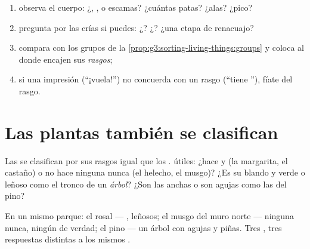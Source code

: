 \begin{method}\label{met:g3:sorting-living-things:sort}
\begin{enumerate}
  \item observa el cuerpo: ¿, ,  o escamas? ¿cuántas
        patas? ¿alas? ¿pico?
  \item pregunta por las crías si puedes: ¿? ¿? ¿una etapa
        de renacuajo?
  \item compara con los grupos de la
        \cref{prop:g3:sorting-living-things:groups} y coloca al 
        donde encajen sus \emph{rasgos};
  \item si una impresión (``¡vuela!'') no concuerda con un rasgo
        (``tiene ''), fíate del rasgo.
\end{enumerate}
\end{method}

\section{Las plantas también se clasifican}

\begin{proposition}\label{prop:g3:sorting-living-things:plants}
Las  se clasifican por sus rasgos igual que los .
 útiles: ¿hace \emph{} y  (la margarita, el
castaño) o no hace ninguna nunca (el helecho, el musgo)? ¿Es su 
blando y verde o leñoso como el tronco de un \emph{árbol}? ¿Son las
 anchas o son agujas como las del pino?
\end{proposition}
\admitted

\begin{example}\label{ex:g3:sorting-living-things:park}
En un mismo parque: el rosal --- ,  leñosos; el musgo del
muro norte --- ninguna  nunca, ningún  de verdad; el pino ---
un árbol con agujas y piñas. Tres , tres respuestas distintas a
los mismos .
\end{example}

